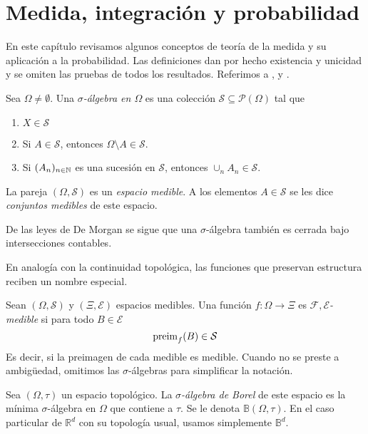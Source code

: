 \documentclass[main.tex]{subfiles}
\begin{document}
\chapter{Medida, integración y probabilidad}

En este capítulo revisamos algunos conceptos de teoría de la medida y su aplicación a la probabilidad. Las definiciones dan por hecho existencia y unicidad y se omiten las pruebas de todos los resultados. Referimos a \cite{halmos1949}, \cite{durrett} y \cite{ash}.
\begin{definition}
Sea $\Omega\neq\emptyset$. Una \textit{$\sigma$-álgebra en $\Omega$} es una colección $\mathcal{S}\subseteq\mathcal{P}(\Omega)$ tal que
\begin{enumerate}[label=\roman*.]
	\item $X \in \mathcal{S}$
	\item Si $A\in\mathcal{S}$, entonces $\Omega\setminus A \in \mathcal{S}$.
	\item Si $(A_n)_{n\in\operatorname{\mathbb{N}}}$ es una sucesión en $\mathcal{S}$, entonces $\cup_nA_n\in \mathcal{S}$.
\end{enumerate}
La pareja $(\Omega, \mathcal{S})$ es un \textit{espacio medible}. A los elementos $A\in\mathcal{S}$ se les dice \textit{conjuntos medibles} de este espacio.
\end{definition}

De las leyes de De Morgan se sigue que una $\sigma$-álgebra también es cerrada bajo intersecciones contables. 

En analogía con la continuidad topológica, las funciones que preservan estructura reciben un nombre especial.

\begin{definition}
Sean $(\Omega, \mathcal{S})$ y $(\Xi, \mathcal{E})$ espacios medibles. Una función $f: \Omega \to \Xi$ es $\mathcal{F,E}$\textit{-medible} si para todo $B\in\mathcal{E}$
\begin{equation*}
\operatorname{preim}_f(B)\in\mathcal{S}	
\end{equation*}
Es decir, si la preimagen de cada medible es medible. Cuando no se preste a ambigüedad, omitimos las $\sigma$-álgebras para simplificar la notación.
\end{definition}

\begin{definition}
Sea $(\Omega, \tau)$ un espacio topológico. La $\sigma$\textit{-álgebra de Borel} de este espacio es la mínima $\sigma$-álgebra en $\Omega$ que contiene a $\tau$. Se le denota $\mathbb{B}(\Omega, \tau)$.
En el caso particular de $\mathbb{R}^d$ con su topología usual, usamos simplemente $\mathbb{B}^d$.
\end{definition}
\end{document}
